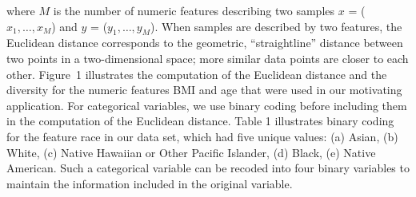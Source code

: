 \documentclass[
]{article}
\begin{document}
where \(M\) is the number of numeric features describing two samples
\(x\) = (\(x_1, \ldots, x_M\)) and \(y\) = (\(y_1, \ldots, y_M\)). When
samples are described by two features, the Euclidean distance
corresponds to the geometric, ``straightline'' distance between two
points in a two-dimensional space; more similar data points are closer
to each other. Figure~1 illustrates the computation of the Euclidean
distance and the diversity for the numeric features BMI and age that
were used in our motivating application. For categorical variables, we
use binary coding before including them in the computation of the
Euclidean distance. Table 1 illustrates binary coding for the feature
race in our data set, which had five unique values: (a) Asian, (b)
White, (c) Native Hawaiian or Other Pacific Islander, (d) Black, (e)
Native American. Such a categorical variable can be recoded into four
binary variables to maintain the information included in the original
variable.
\end{document}
